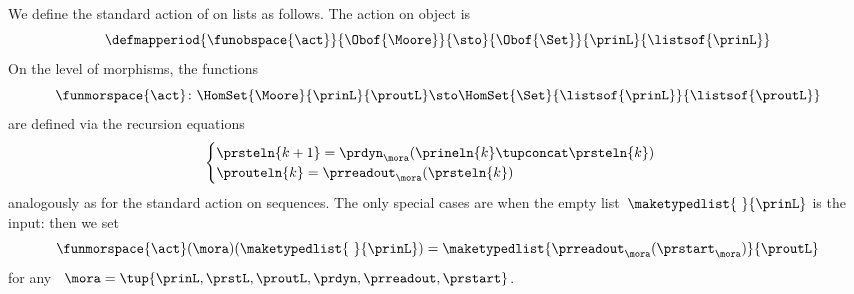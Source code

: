 \begin{definition}
    \label{def:moore-standard-action-on-lists}
    We define the standard action of  on lists as follows.
    The action on object is
    \begin{equation}
        \defmapperiod{\funobspace{\act}}
        {\Obof{\Moore}}
        {\sto}
        {\Obof{\Set}}
        {\prinL}
        {\listsof{\prinL}}
    \end{equation}
    On the level of morphisms, the functions
    \begin{equation}
        \funmorspace{\act} \colon \HomSet{\Moore}{\prinL}{\proutL} \sto \HomSet{\Set}{ \listsof{\prinL}}{\listsof{\proutL}}
    \end{equation}
    are defined via the recursion equations
    \begin{equation}
        \begin{cases}
            \prsteln{k+1} = \prdyn_\mora(\prineln{k} \tupconcat \prsteln{k}) \\
            \prouteln{k} = \prreadout_\mora(\prsteln{k})
        \end{cases}
    \end{equation}
    analogously as for the standard action on sequences.
    The only special cases are when the empty list~$\maketypedlist{\ }{\prinL}$ is the input: then we set
    \begin{equation}
        \funmorspace{\act}(\mora)(\maketypedlist{\ }{\prinL}) = \maketypedlist{ \prreadout_\mora(\prstart_\mora) }{\proutL}
    \end{equation}
    for any ~$\mora = \tup{\prinL,\prstL,\proutL,\prdyn,\prreadout,\prstart}$.
\end{definition}

